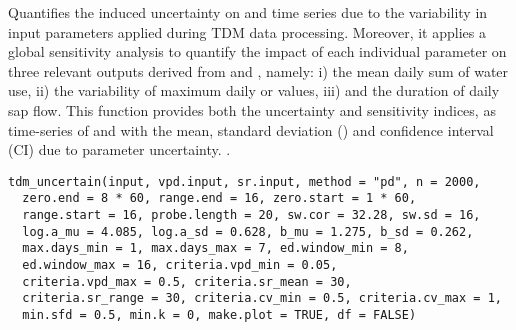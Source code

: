 \documentclass[a4paper]{book}
\begin{document}
%
\begin{Description}\relax
Quantifies the induced uncertainty on  and  time series due to the variability
in input parameters applied during TDM data processing. Moreover, it applies a global sensitivity
analysis to quantify the impact of each individual parameter on three relevant outputs derived from  and , namely:
i) the mean daily sum of water use,
ii) the variability of maximum daily  or  values,
iii) and the duration of daily sap flow.
This function provides both the uncertainty and sensitivity indices, as time-series of  and  with the mean,
standard deviation () and confidence interval (CI) due to parameter uncertainty.
.
\end{Description}
%
\begin{Usage}
\begin{verbatim}
tdm_uncertain(input, vpd.input, sr.input, method = "pd", n = 2000,
  zero.end = 8 * 60, range.end = 16, zero.start = 1 * 60,
  range.start = 16, probe.length = 20, sw.cor = 32.28, sw.sd = 16,
  log.a_mu = 4.085, log.a_sd = 0.628, b_mu = 1.275, b_sd = 0.262,
  max.days_min = 1, max.days_max = 7, ed.window_min = 8,
  ed.window_max = 16, criteria.vpd_min = 0.05,
  criteria.vpd_max = 0.5, criteria.sr_mean = 30,
  criteria.sr_range = 30, criteria.cv_min = 0.5, criteria.cv_max = 1,
  min.sfd = 0.5, min.k = 0, make.plot = TRUE, df = FALSE)
\end{verbatim}
\end{Usage}
%
\end{document}
